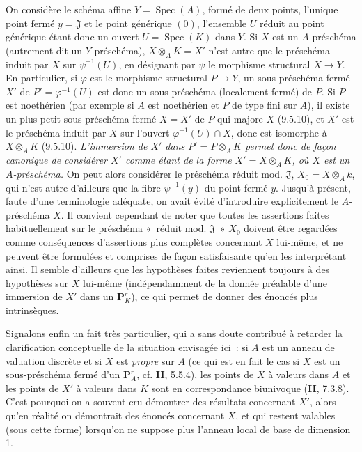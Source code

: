 \begin{env}[3.7.2]
On considère le schéma affine $Y=\operatorname{Spec}(A)$, formé de deux
points, l'unique point
fermé $y=\mathfrak{J}$ et le point générique $(0)$, l'ensemble $U$ réduit au
point générique étant donc un ouvert $U=\operatorname{Spec}(K)$ dans $Y$. Si
$X$ est un $A$-préschéma (autrement dit un $Y$-préschéma),
$X\otimes_A K=X'$ n'est autre que le préschéma induit par $X$ sur
$\psi^{-1}(U)$, en désignant par $\psi$ le morphisme structural $X\to Y$. En
particulier, si $\varphi$ est le morphisme structural $P\to Y$, un
sous-préschéma fermé $X'$ de $P'=\varphi^{-1}(U)$ est donc un sous-préschéma
(localement fermé) de $P$. Si $P$ est noethérien (par exemple si $A$ est
noethérien et $P$ de type fini sur $A$), il existe un plus petit
sous-préschéma fermé $X=\overline{X}'$ de $P$ qui majore $X$ (9.5.10), et
$X'$ est le préschéma induit par $X$ sur l'ouvert
$\varphi^{-1}(U)\cap X$, donc est isomorphe à $X\otimes_A K$ (9.5.10).
\emph{L'immersion de $X'$ dans $P'=P\otimes_A K$ permet donc de façon
canonique de considérer $X'$ comme étant de la forme $X'=X\otimes_A K$, où
$X$ est un $A$-préschéma.} On peut alors considérer le préschéma réduit mod.
$\mathfrak{J}$, $X_0=X\otimes_A k$, qui n'est autre d'ailleurs que la fibre
$\psi^{-1}(y)$ du point fermé $y$. Jusqu'à présent, faute d'une terminologie
adéquate, on avait évité d'introduire explicitement le $A$-préschéma $X$. Il
convient cependant de noter que toutes les assertions faites habituellement
sur le préschéma «~réduit mod. $\mathfrak{J}$~» $X_0$ doivent être regardées
comme conséquences d'assertions plus complètes concernant $X$ lui-même, et ne
peuvent être formulées et comprises de façon satisfaisante qu'en les
interprétant ainsi. Il semble d'ailleurs que les hypothèses faites reviennent
toujours à des hypothèses sur $X$ lui-même (indépendamment de la donnée
préalable d'une immersion de $X'$ dans un $\mathbf{P}_K^r$), ce qui permet de
donner des énoncés plus intrinsèques.
\end{env}

\begin{env}[3.7.3]
\label{I.3.7.3-fr}
Signalons enfin un fait très particulier, qui a sans doute contribué à
retarder la clarification conceptuelle de la situation envisagée ici~: si
$A$ est un anneau de valuation discrète et si $X$ est \emph{propre} sur $A$
(ce qui est en fait le cas si $X$ est un sous-préschéma fermé d'un
$\mathbf{P}_A^r$, cf. \textbf{II}, 5.5.4), les points de $X$ à valeurs dans $A$ et les
points de $X'$ à valeurs dans $K$ sont en correspondance biunivoque
(\textbf{II}, 7.3.8). C'est pourquoi on a souvent cru démontrer des résultats
concernant $X'$, alors qu'en réalité on démontrait des énoncés concernant
$X$, et qui restent valables (sous cette forme) lorsqu'on ne suppose plus
l'anneau local de base de dimension 1.
\end{env}
